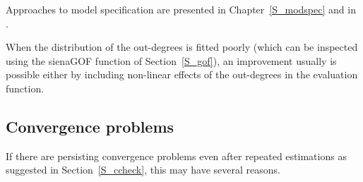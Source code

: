 \documentclass[a4paper,fleqn,11pt]{article}
\newcommand{\+}{\, + \,}
\newcommand{\sfn}[1]{\textsf{#1}}
\begin{document}
Approaches to model specification are presented in Chapter~\ref{S_modspec}
and in \citet*{SnijdersEA10b}.

When the distribution of the out-degrees is fitted poorly
(which can be inspected using the \sfn{sienaGOF} function
of Section~\ref{S_gof}), an improvement
usually is possible either by including non-linear effects of the
out-degrees in the evaluation function.

\subsection{Convergence problems}

If there are persisting convergence problems even after repeated estimations
as suggested in Section~\ref{S_ccheck}, this may have several reasons.
\end{document}
